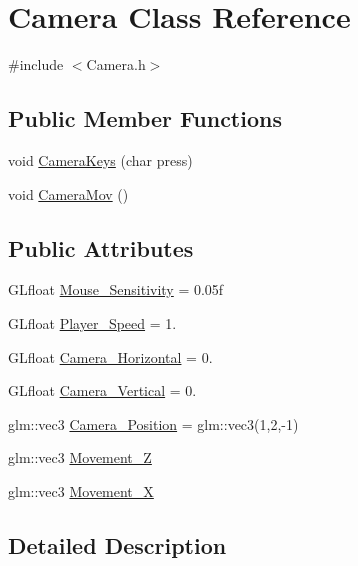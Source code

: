 \hypertarget{class_camera}{}\section{Camera Class Reference}
\label{class_camera}


{\ttfamily \#include $<$Camera.\+h$>$}

\subsection*{Public Member Functions}
\begin{DoxyCompactItemize}
\item 
void \hyperlink{class_camera_ae97e22115cee81d2901119faa9d23f38}{Camera\+Keys} (char press)
\item 
void \hyperlink{class_camera_a9d65e0f62f7e8b3f73206c78c23a3734}{Camera\+Mov} ()
\end{DoxyCompactItemize}
\subsection*{Public Attributes}
\begin{DoxyCompactItemize}
\item 
G\+Lfloat \hyperlink{class_camera_ada530cf7b97b15431c729ddc3435d702}{Mouse\+\_\+\+Sensitivity} = 0.\+05f
\item 
G\+Lfloat \hyperlink{class_camera_ab20174a89f86b685216dfe825e9ce95d}{Player\+\_\+\+Speed} = 1.
\item 
G\+Lfloat \hyperlink{class_camera_af7417751723d080a43ac38a0ae922e7d}{Camera\+\_\+\+Horizontal} = 0.
\item 
G\+Lfloat \hyperlink{class_camera_a7ca0772371495e93f9054b5fa3731294}{Camera\+\_\+\+Vertical} = 0.
\item 
glm\+::vec3 \hyperlink{class_camera_a95720b391db9ebf7c89099e317a1457b}{Camera\+\_\+\+Position} = glm\+::vec3(1,2,-\/1)
\item 
glm\+::vec3 \hyperlink{class_camera_a61b6a55a798d329e9cbc5116d859c9b0}{Movement\+\_\+\+Z}
\item 
glm\+::vec3 \hyperlink{class_camera_aeb46eafc5ef6dbbc36667236f3dc3356}{Movement\+\_\+\+X}
\end{DoxyCompactItemize}


\subsection{Detailed Description}



